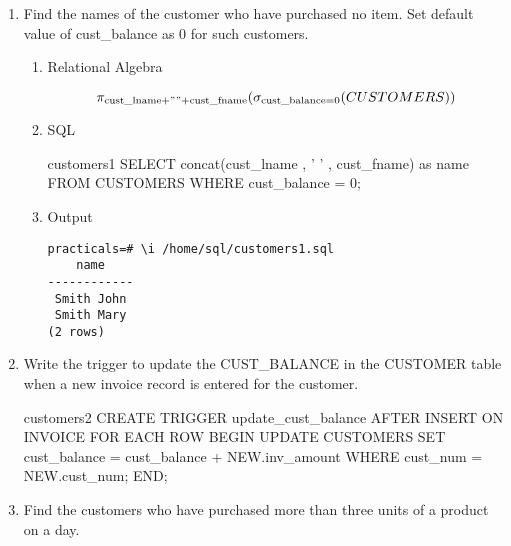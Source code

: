 \begin{enumerate}
    \item Find the names of the customer who have purchased no item. Set default value of cust\_balance as 0 for
          such customers.

          \begin{enumerate}
              \item Relational Algebra

                    \begin{equation*}
                        \pi_{\text{cust\_lname} + " " + \text{cust\_fname}}(\sigma_{\text{cust\_balance} = 0} (CUSTOMERS))
                    \end{equation*}
                    \pagebreak

              \item SQL

                    \begin{sqlQuery}{customers1}
                        SELECT concat(cust_lname , ' ' , cust_fname) as name
                        FROM CUSTOMERS
                        WHERE cust_balance = 0;
                    \end{sqlQuery}

              \item Output

                    \begin{lstlisting}[style=output]
practicals=# \i /home/sql/customers1.sql
    name    
------------
 Smith John
 Smith Mary
(2 rows)
                    \end{lstlisting}

          \end{enumerate}

    \item Write the trigger to update the \textsc{CUST\_BALANCE} in the CUSTOMER table when a new invoice record
          is entered for the customer.


          \begin{sqlQuery}{customers2}
                CREATE TRIGGER update_cust_balance
                AFTER INSERT ON INVOICE
                FOR EACH ROW
                BEGIN
                    UPDATE CUSTOMERS
                    SET cust_balance = cust_balance + NEW.inv_amount
                    WHERE cust_num = NEW.cust_num;
                END;
        \end{sqlQuery}


    \item Find the customers who have purchased more than three units of a product on a day.


\end{enumerate}
